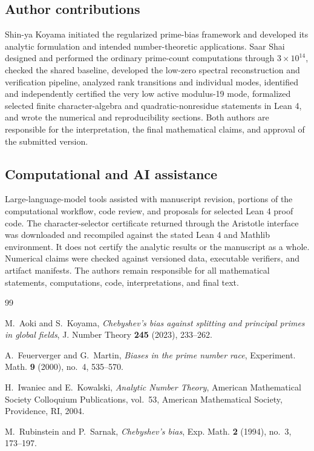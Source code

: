 \documentclass[12pt,reqno]{amsart}
\theoremstyle{definition}
\theoremstyle{remark}
\numberwithin{equation}{section}
\begin{document}
\subsection{Author contributions}

Shin-ya Koyama initiated the regularized prime-bias framework and developed
its analytic formulation and intended number-theoretic applications.  Saar
Shai designed and performed the ordinary prime-count computations through
$3\times10^{14}$, checked the shared baseline, developed the low-zero spectral
reconstruction and verification pipeline, analyzed rank transitions and
individual modes, identified and independently certified the very low active
modulus-19 mode, formalized selected finite character-algebra and
quadratic-nonresidue statements in Lean 4, and wrote the numerical and
reproducibility sections.  Both authors are responsible for the interpretation,
the final mathematical claims, and approval of the submitted version.

\subsection{Computational and AI assistance}

Large-language-model tools assisted with manuscript revision, portions of the
computational workflow, code review, and proposals for selected Lean 4 proof
code.  The character-selector certificate returned through the Aristotle
interface was downloaded and recompiled against the stated Lean 4 and Mathlib
environment.  It does not certify the analytic results or the manuscript as a
whole.  Numerical claims were checked against versioned data, executable
verifiers, and artifact manifests.  The authors remain responsible for all
mathematical statements, computations, code, interpretations, and final text.

\begin{thebibliography}{99}

M.~Aoki and S.~Koyama,
\textit{ Chebyshev's bias against splitting and principal primes in global ﬁelds},
J. Number Theory \textbf{245} (2023), 233–262.

A.~Feuerverger and G.~Martin,
\textit{Biases in the prime number race},
Experiment. Math. \textbf{9} (2000), no.~4, 535--570.

H.~Iwaniec and E.~Kowalski,
\textit{Analytic Number Theory},
American Mathematical Society Colloquium Publications, vol.~53, American Mathematical Society, Providence, RI, 2004.

M.~Rubinstein and P.~Sarnak,
\textit{Chebyshev's bias},
Exp. Math. \textbf{2} (1994), no.~3, 173--197.

\end{thebibliography}
\end{document}
